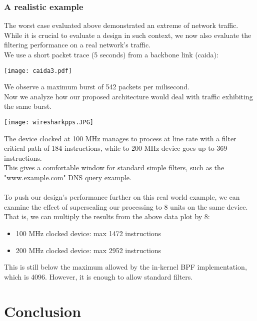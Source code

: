 \documentclass{l4proj}
\begin{document}
\subsection{A realistic example}
The worst case evaluated above demonstrated an extreme of network traffic. While it is crucial to evaluate a design in such context, we now also evaluate the filtering performance on a real network's  traffic.\\
We use a short packet trace (5 seconds) from a backbone link (caida):\\
\begin{center}
\texttt{[image: caida3.pdf]}\\
\end{center}
We observe a maximum burst of 542 packets per milisecond.\\
Now we analyze how our proposed architecture would deal with traffic exhibiting the same burst.\\
\begin{center}
\texttt{[image: wiresharkpps.JPG]}\\
\end{center}
The device clocked at 100 MHz manages to process at line rate with a filter critical path of 184 instructions, while to 200 MHz device goes up to 369 instructions.\\
This gives a comfortable window for standard simple filters, such as the "www.example.com" DNS query example.\\\\
To push our design's performance further on this real world example, we can examine the effect of superscaling our processing to 8 units on the same device. That is, we can multiply the results from the above data plot by 8:\\
\begin{itemize}
    \item 100 MHz clocked device: max 1472 instructions
    \item 200 MHz clocked device: max 2952 instructions
\end{itemize}
This is still below the maximum allowed by the in-kernel BPF implementation, which is 4096. However, it is enough to allow standard filters.

\chapter{Conclusion}
\end{document}
